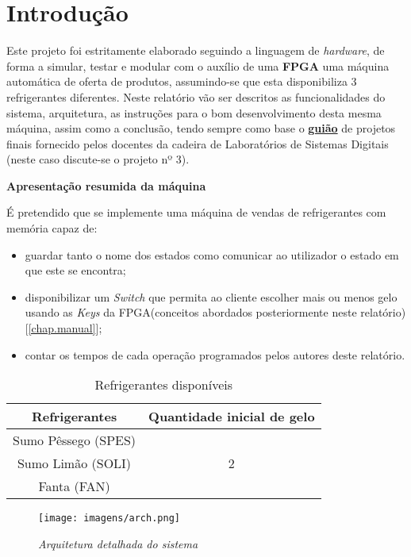 \documentclass{report}
\begin{document}
\chapter{Introdução}
\label{chap.introducao}
Este projeto foi estritamente elaborado seguindo a linguagem de \textit{hardware}, de forma a simular, testar e modular com o auxílio de uma \textbf{FPGA} uma máquina automática de oferta de produtos, assumindo-se que esta disponibiliza 3 refrigerantes diferentes.
Neste relatório vão ser descritos as funcionalidades do sistema, arquitetura, as instruções para o bom desenvolvimento desta mesma máquina, assim como a conclusão, tendo sempre como base o \href{https://elearning.ua.pt/mod/folder/view.php?id=942630}{\textbf{guião}} de projetos finais fornecido pelos docentes da cadeira de Laboratórios de Sistemas Digitais (neste caso discute-se o projeto nº 3). 
%
\begin{center}
\LARGE\textbf{{Apresentação resumida da máquina}}
\end{center}
%
É pretendido que se implemente uma máquina de vendas de refrigerantes com memória capaz de:
%
\begin{itemize}
    \item guardar tanto o nome dos estados como comunicar ao utilizador o estado em que este se encontra;
    \item disponibilizar um \textit{Switch} que permita ao cliente escolher mais ou menos gelo usando as \textit{Keys} da FPGA(conceitos abordados posteriormente neste relatório)[\ref{chap.manual}];
    \item contar os tempos de cada operação programados pelos autores deste relatório.
\end{itemize} 
%
%
\begin{table}
    \centering
    \begin{tabular}{|c|c|}
        \hline
        \textbf{Refrigerantes} & \textbf{Quantidade inicial de gelo} \\ \hline
        Sumo Pêssego (SPES) &\\
        Sumo Limão (SOLI)& 2\\ 
        Fanta (FAN) & \\
        \hline
    \end{tabular} \label{tabela}
    \caption{Refrigerantes disponíveis}
\end{table}

\begin{figure} 
    \centering
    \texttt{[image: imagens/arch.png]}
    \caption{\textit{Arquitetura detalhada do sistema}} \label{fig6:arch}
\end{figure}
\end{document}

